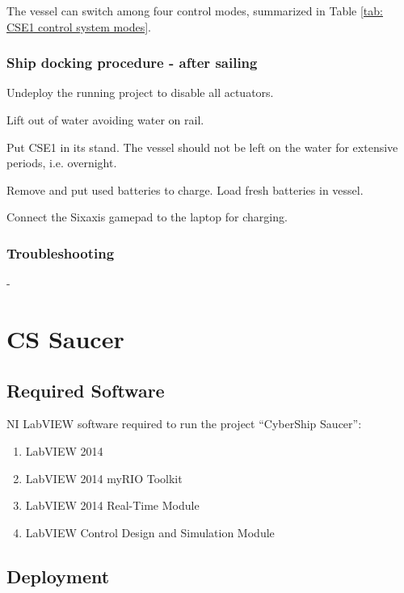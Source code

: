 \documentclass[a4paper,twoside,english]{report}
\begin{document}
The vessel can switch among four control modes, summarized in Table
\ref{tab: CSE1 control system modes}. 

\clearpage{}

\subsection{Ship docking procedure - after sailing}

Undeploy the running project to disable all actuators.

Lift out of water avoiding water on rail.

Put CSE1 in its stand. The vessel should not be left on the water
for extensive periods, i.e. overnight.

Remove and put used batteries to charge. Load fresh batteries in vessel.

Connect the Sixaxis gamepad to the laptop for charging.

\clearpage{}

\subsection{Troubleshooting}

-

\FloatBarrier

\clearpage{}

\chapter{CS Saucer}

\section{Required Software}

NI LabVIEW software required to run the project ``CyberShip Saucer'':
\begin{enumerate}
\item LabVIEW 2014
\item LabVIEW 2014 myRIO Toolkit
\item LabVIEW 2014 Real-Time Module
\item LabVIEW Control Design and Simulation Module
\end{enumerate}

\section{Deployment}
\end{document}
